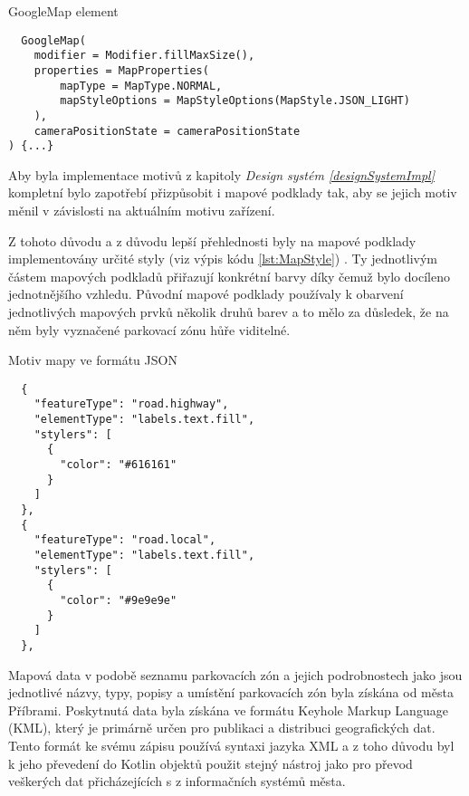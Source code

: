 
\begin{listing}[H]
\caption{GoogleMap element}\label{lst:GoogleMapview}
\begin{verbatim}
  GoogleMap(
    modifier = Modifier.fillMaxSize(),
    properties = MapProperties(
        mapType = MapType.NORMAL,
        mapStyleOptions = MapStyleOptions(MapStyle.JSON_LIGHT)
    ),
    cameraPositionState = cameraPositionState
) {...}
\end{verbatim}
\end{listing}


Aby byla implementace motivů z kapitoly \textit{Design systém \ref{designSystemImpl}} kompletní bylo zapotřebí přizpůsobit i mapové podklady tak,
aby se jejich motiv měnil v závislosti na aktuálním motivu zařízení.

Z tohoto důvodu a z důvodu lepší přehlednosti byly na mapové podklady implementovány určité styly (viz výpis kódu \ref{lst:MapStyle}) \cite{googleStyles}.
Ty jednotlivým částem mapových podkladů přiřazují konkrétní barvy díky čemuž bylo docíleno jednotnějšího vzhledu. Původní mapové podklady
používaly k obarvení jednotlivých mapových prvků několik druhů barev a to mělo za důsledek, že na něm byly vyznačené parkovací zónu hůře viditelné.

\begin{listing}[H]
\caption{Motiv mapy ve formátu JSON}\label{lst:MapStyle}
\begin{verbatim}
  {
    "featureType": "road.highway",
    "elementType": "labels.text.fill",
    "stylers": [
      {
        "color": "#616161"
      }
    ]
  },
  {
    "featureType": "road.local",
    "elementType": "labels.text.fill",
    "stylers": [
      {
        "color": "#9e9e9e"
      }
    ]
  },
\end{verbatim}
\end{listing}

Mapová data v podobě seznamu parkovacích zón a jejich podrobnostech jako jsou jednotlivé názvy, typy, popisy a umístění parkovacích zón byla 
získána od města Příbrami. Poskytnutá data byla získána ve formátu Keyhole Markup Language (KML), který je primárně určen pro publikaci a 
distribuci geografických dat. Tento formát ke svému zápisu používá syntaxi jazyka XML a z toho důvodu byl k jeho převedení do Kotlin objektů 
použit stejný nástroj jako pro převod veškerých dat přicházejících s z informačních systémů města.

